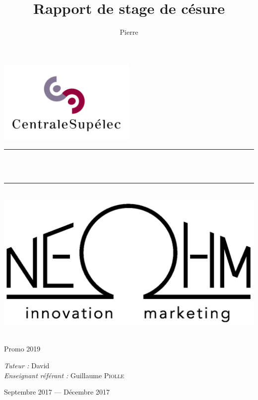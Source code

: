 \documentclass[a4paper, 12pt, sffamily]{report}
\title{Rapport de stage de césure}
\author{Pierre \bsc{Gintrand}}
\newcommand{\HRule}{\rule{\linewidth}{0.5mm}}
\begin{document}
\sffamily %


\makeatletter %
\begin{titlepage}
\begin{center}

\includegraphics[width=0.5\textwidth]{figures/logos/centralesupelec_logo.png}~\\[3cm]

\HRule \\[0.4cm]
{ \huge \bfseries \@title \\[0.4cm] }

\HRule \\[2cm]

\includegraphics[scale=0.3]{figures/logos/neohm_logo.png}\\[2.5cm]

\begin{minipage}{0.35\textwidth}
  \begin{flushleft} \large
    \textbf{\@author}\\
    Promo 2019\\
  \end{flushleft}
\end{minipage}
\begin{minipage}{0.6\textwidth}
  \begin{flushright} \large
    \emph{Tuteur :} David \\
    \emph{Enseignant référant :} Guillaume \textsc{Piolle}
  \end{flushright}
\end{minipage}

\vfill

{\large Septembre 2017 — Décembre 2017}

\end{center}
\end{titlepage}
\makeatother %
\end{document}
